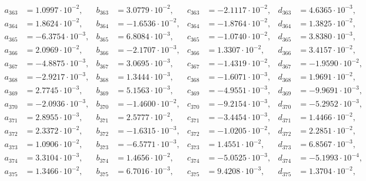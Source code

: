 \begin{align*}
  a_{ 363 } &= 1.0997 \cdot 10^{ -2 }, & b_{ 363 } &= 3.0779 \cdot 10^{ -2 }, & c_{ 363 } &= -2.1117 \cdot 10^{ -2 }, & d_{ 363 } &= 4.6365 \cdot 10^{ -3 }, \\ 
  a_{ 364 } &= 1.8624 \cdot 10^{ -2 }, & b_{ 364 } &= -1.6536 \cdot 10^{ -2 }, & c_{ 364 } &= -1.8764 \cdot 10^{ -2 }, & d_{ 364 } &= 1.3825 \cdot 10^{ -2 }, \\ 
  a_{ 365 } &= -6.3754 \cdot 10^{ -3 }, & b_{ 365 } &= 6.8084 \cdot 10^{ -3 }, & c_{ 365 } &= -1.0740 \cdot 10^{ -2 }, & d_{ 365 } &= 3.8380 \cdot 10^{ -3 }, \\ 
  a_{ 366 } &= 2.0969 \cdot 10^{ -2 }, & b_{ 366 } &= -2.1707 \cdot 10^{ -3 }, & c_{ 366 } &= 1.3307 \cdot 10^{ -2 }, & d_{ 366 } &= 3.4157 \cdot 10^{ -2 }, \\ 
  a_{ 367 } &= -4.8875 \cdot 10^{ -3 }, & b_{ 367 } &= 3.0695 \cdot 10^{ -3 }, & c_{ 367 } &= -1.4319 \cdot 10^{ -2 }, & d_{ 367 } &= -1.9590 \cdot 10^{ -2 }, \\ 
  a_{ 368 } &= -2.9217 \cdot 10^{ -3 }, & b_{ 368 } &= 1.3444 \cdot 10^{ -3 }, & c_{ 368 } &= -1.6071 \cdot 10^{ -3 }, & d_{ 368 } &= 1.9691 \cdot 10^{ -2 }, \\ 
  a_{ 369 } &= 2.7745 \cdot 10^{ -3 }, & b_{ 369 } &= 5.1563 \cdot 10^{ -3 }, & c_{ 369 } &= -4.9551 \cdot 10^{ -3 }, & d_{ 369 } &= -9.9691 \cdot 10^{ -3 }, \\ 
  a_{ 370 } &= -2.0936 \cdot 10^{ -3 }, & b_{ 370 } &= -1.4600 \cdot 10^{ -2 }, & c_{ 370 } &= -9.2154 \cdot 10^{ -3 }, & d_{ 370 } &= -5.2952 \cdot 10^{ -3 }, \\ 
  a_{ 371 } &= 2.8955 \cdot 10^{ -3 }, & b_{ 371 } &= 2.5777 \cdot 10^{ -2 }, & c_{ 371 } &= -3.4454 \cdot 10^{ -3 }, & d_{ 371 } &= 1.4466 \cdot 10^{ -2 }, \\ 
  a_{ 372 } &= 2.3372 \cdot 10^{ -2 }, & b_{ 372 } &= -1.6315 \cdot 10^{ -3 }, & c_{ 372 } &= -1.0205 \cdot 10^{ -2 }, & d_{ 372 } &= 2.2851 \cdot 10^{ -2 }, \\ 
  a_{ 373 } &= 1.0906 \cdot 10^{ -2 }, & b_{ 373 } &= -6.5771 \cdot 10^{ -3 }, & c_{ 373 } &= 1.4551 \cdot 10^{ -2 }, & d_{ 373 } &= 6.8567 \cdot 10^{ -3 }, \\ 
  a_{ 374 } &= 3.3104 \cdot 10^{ -3 }, & b_{ 374 } &= 1.4656 \cdot 10^{ -2 }, & c_{ 374 } &= -5.0525 \cdot 10^{ -3 }, & d_{ 374 } &= -5.1993 \cdot 10^{ -4 }, \\ 
  a_{ 375 } &= 1.3466 \cdot 10^{ -2 }, & b_{ 375 } &= 6.7016 \cdot 10^{ -3 }, & c_{ 375 } &= 9.4208 \cdot 10^{ -3 }, & d_{ 375 } &= 1.3704 \cdot 10^{ -2 }, \\ 

\end{align*}
